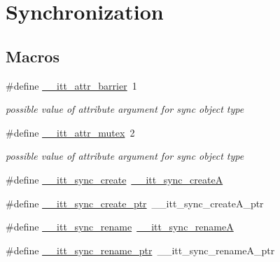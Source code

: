 \hypertarget{group__sync}{\section{Synchronization}
\label{group__sync}
}
\subsection*{Macros}
\begin{DoxyCompactItemize}
\item 
\#define \hyperlink{group__sync_gaa2de2b08cecad1d567b5312c503ad217}{\-\_\-\-\_\-itt\-\_\-attr\-\_\-barrier}~1
\begin{DoxyCompactList}\small\item\em possible value of attribute argument for sync object type \end{DoxyCompactList}\item 
\#define \hyperlink{group__sync_ga8c78a4fc23e9e2ed0f3d19cd92c7a60d}{\-\_\-\-\_\-itt\-\_\-attr\-\_\-mutex}~2
\begin{DoxyCompactList}\small\item\em possible value of attribute argument for sync object type \end{DoxyCompactList}\item 
\#define \hyperlink{group__sync_gaa7e7aa1f544a4a08faee32b776d534b1}{\-\_\-\-\_\-itt\-\_\-sync\-\_\-create}~\hyperlink{group__sync_ga243666487ff4b8904f1629fa15782af4}{\-\_\-\-\_\-itt\-\_\-sync\-\_\-create\-A}
\item 
\#define \hyperlink{group__sync_gab7f1ba7abf5c98e0e0e0ea53d0e34661}{\-\_\-\-\_\-itt\-\_\-sync\-\_\-create\-\_\-ptr}~\-\_\-\-\_\-itt\-\_\-sync\-\_\-create\-A\-\_\-ptr
\item 
\#define \hyperlink{group__sync_gac8b1ff0b07abb7867832206f7de355ea}{\-\_\-\-\_\-itt\-\_\-sync\-\_\-rename}~\hyperlink{group__sync_ga8e0ee60520e20d33f9dce510b978bb3b}{\-\_\-\-\_\-itt\-\_\-sync\-\_\-rename\-A}
\item 
\#define \hyperlink{group__sync_ga1983a053576fe0172533423524e259b0}{\-\_\-\-\_\-itt\-\_\-sync\-\_\-rename\-\_\-ptr}~\-\_\-\-\_\-itt\-\_\-sync\-\_\-rename\-A\-\_\-ptr
\end{DoxyCompactItemize}
